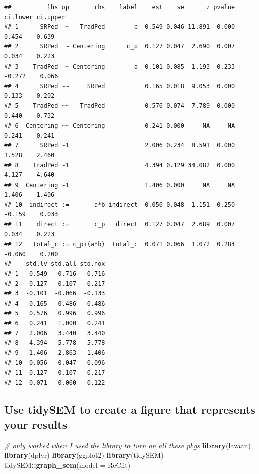 \documentclass[
  11pt,
]{book}
\newenvironment{Shaded}{\begin{snugshade}}{\end{snugshade}}
\newcommand{\AttributeTok}[1]{\textcolor[rgb]{0.27,0.27,0.27}{#1}}
\newcommand{\CommentTok}[1]{\textcolor[rgb]{0.37,0.37,0.37}{\textit{#1}}}
\newcommand{\FunctionTok}[1]{\textcolor[rgb]{0.27,0.27,0.27}{\textbf{#1}}}
\newcommand{\NormalTok}[1]{#1}
\newcommand{\SpecialCharTok}[1]{\textcolor[rgb]{0.43,0.43,0.43}{\textbf{#1}}}
\begin{document}
\begin{verbatim}
##          lhs op       rhs    label    est    se      z pvalue ci.lower ci.upper
## 1      SRPed  ~   TradPed        b  0.549 0.046 11.891  0.000    0.454    0.639
## 2      SRPed  ~ Centering      c_p  0.127 0.047  2.690  0.007    0.034    0.223
## 3    TradPed  ~ Centering        a -0.101 0.085 -1.193  0.233   -0.272    0.066
## 4      SRPed ~~     SRPed           0.165 0.018  9.053  0.000    0.133    0.202
## 5    TradPed ~~   TradPed           0.576 0.074  7.789  0.000    0.440    0.732
## 6  Centering ~~ Centering           0.241 0.000     NA     NA    0.241    0.241
## 7      SRPed ~1                     2.006 0.234  8.591  0.000    1.528    2.460
## 8    TradPed ~1                     4.394 0.129 34.082  0.000    4.127    4.640
## 9  Centering ~1                     1.406 0.000     NA     NA    1.406    1.406
## 10  indirect :=       a*b indirect -0.056 0.048 -1.151  0.250   -0.159    0.033
## 11    direct :=       c_p   direct  0.127 0.047  2.689  0.007    0.034    0.223
## 12   total_c := c_p+(a*b)  total_c  0.071 0.066  1.072  0.284   -0.060    0.200
##    std.lv std.all std.nox
## 1   0.549   0.716   0.716
## 2   0.127   0.107   0.217
## 3  -0.101  -0.066  -0.133
## 4   0.165   0.486   0.486
## 5   0.576   0.996   0.996
## 6   0.241   1.000   0.241
## 7   2.006   3.440   3.440
## 8   4.394   5.778   5.778
## 9   1.406   2.863   1.406
## 10 -0.056  -0.047  -0.096
## 11  0.127   0.107   0.217
## 12  0.071   0.060   0.122
\end{verbatim}

\hypertarget{use-tidysem-to-create-a-figure-that-represents-your-results}{%
\subsection*{Use tidySEM to create a figure that represents your results}\label{use-tidysem-to-create-a-figure-that-represents-your-results}}


\begin{Shaded}
\begin{Highlighting}[]
\CommentTok{\# only worked when I used the library to turn on all these pkgs}
\FunctionTok{library}\NormalTok{(lavaan)}
\FunctionTok{library}\NormalTok{(dplyr)}
\FunctionTok{library}\NormalTok{(ggplot2)}
\FunctionTok{library}\NormalTok{(tidySEM)}
\NormalTok{tidySEM}\SpecialCharTok{::}\FunctionTok{graph\_sem}\NormalTok{(}\AttributeTok{model =}\NormalTok{ ReCfit)}
\end{Highlighting}
\end{Shaded}
\end{document}
